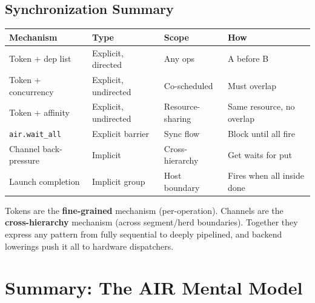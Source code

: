 \documentclass[11pt,a4paper]{article}
\begin{document}
\subsection{Synchronization Summary}

\begin{center}
\small
\begin{tabular}{llll}
\toprule
\textbf{Mechanism} & \textbf{Type} & \textbf{Scope} & \textbf{How} \\
\midrule
Token + dep list & Explicit, directed & Any ops & A before B \\
Token + concurrency & Explicit, undirected & Co-scheduled & Must overlap \\
Token + affinity & Explicit, undirected & Resource-sharing & Same resource, no overlap \\
\texttt{air.wait\_all} & Explicit barrier & Sync flow & Block until all fire \\
Channel back-pressure & Implicit & Cross-hierarchy & Get waits for put \\
Launch completion & Implicit group & Host boundary & Fires when all inside done \\
\bottomrule
\end{tabular}
\end{center}

Tokens are the \textbf{fine-grained} mechanism (per-operation). Channels are the
\textbf{cross-hierarchy} mechanism (across segment/herd boundaries). Together they
express any pattern from fully sequential to deeply pipelined, and backend lowerings
push it all to hardware dispatchers.


\section{Summary: The AIR Mental Model}
\end{document}
